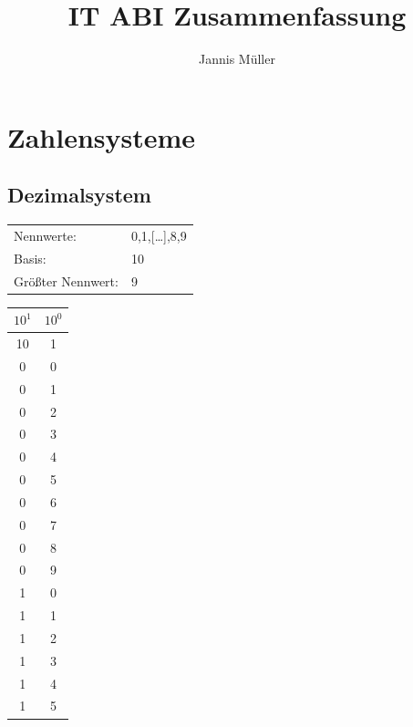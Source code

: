 \documentclass[12pt,a4paper]{article}
\author{Jannis Müller}
\title{IT ABI Zusammenfassung}
\begin{document}
\maketitle
\tableofcontents
\newpage
\section{Zahlensysteme}
\begin{minipage}{.49\textwidth}
\subsection{Dezimalsystem}
\begin{tabularx}{9cm}{XX}
Nennwerte:&0,1,[\dots],8,9\\
Basis:&10\\
Größter Nennwert:&9\\
\end{tabularx}\newline
\begin{center}
    \begin{tabular}{|c|c|}
        \hline

        $10^1$ & $10^0$ \\
        \hline
        10     & 1      \\
        \hline
        \hline
        0      & 0      \\
        0      & 1      \\
        0      & 2      \\
        0      & 3      \\
        0      & 4      \\
        0      & 5      \\
        0      & 6      \\
        0      & 7      \\
        0      & 8      \\
        0      & 9      \\
        1      & 0      \\
        1      & 1      \\
        1      & 2      \\
        1      & 3      \\
        1      & 4      \\
        1      & 5      \\
        \hline
    \end{tabular}
    \end{center}
\end{minipage}
\end{document}
